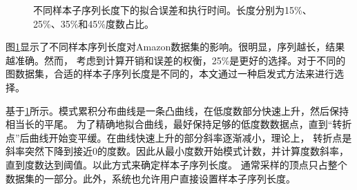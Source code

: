 \documentclass[master]{thesis-uestc}
\begin{document}
\begin{figure}[t]
    \centering
    \hfill
    \hfill
    \hfill
    \caption{不同样本子序列长度下的拟合误差和执行时间。长度分别为15\%、25\%、35\%和45\%度数占比。}
    \label{fig:sample-length}
\end{figure}

    图\ref{fig:sample-length}显示了不同样本序列长度对Amazon数据集的影响。很明显，序列越长，结果越准确。然而，
考虑到计算开销和误差的权衡，25\%是更好的选择。对于不同的图数据集，合适的样本子序列长度是不同的，本文通过一种启发式方法来进行选择。

    基于\ref{fig:sample-length}所示。模式累积分布曲线是一条凸曲线，在低度数部分快速上升，然后保持相当长的平尾。
为了精确地拟合曲线，最好保持足够的低度数数据点，直到“转折点”后曲线开始变平缓。在曲线快速上升的部分斜率逐渐减小，理论上，
转折点是斜率突然下降到接近0的度数。因此从最小度数开始模式计数，并计算度数斜率，直到度数达到阈值。以此方式来确定样本子序列长度。
通常采样的顶点只占整个数据集的一部分。此外，系统也允许用户直接设置样本子序列长度。
\end{document}
